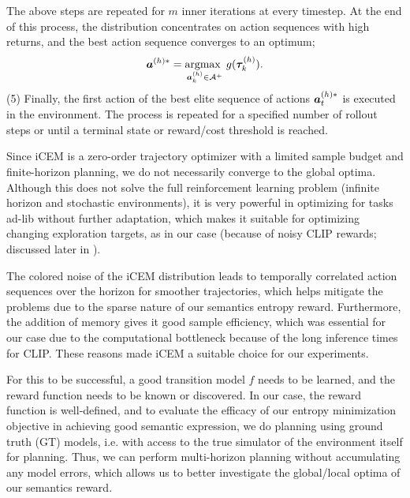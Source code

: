 The above steps are repeated for \(m\) inner iterations at every timestep.
At the end of this process, the distribution concentrates on action sequences with high returns, and the best action sequence converges to an optimum;
\begin{equation}
    \label{eq:planning-goal}
    \bm{a}^{(h)*} = \operatorname*{argmax~}_{\bm{a}^{(h)}_k \in \mathcal{A}^+} g(\bm{\tau}^{(h)}_k).
\end{equation}
(5) Finally, the first action of the best elite sequence of actions \(\bm{a}^{(h)*}_t\) is executed in the environment.
The process is repeated for a specified number of rollout steps or until a terminal state or reward/cost threshold is reached.

Since iCEM is a zero-order trajectory optimizer with a limited sample budget and finite-horizon planning, we do not necessarily converge to the global optima.
Although this does not solve the full reinforcement learning problem (infinite horizon and stochastic environments), it is very powerful in optimizing for tasks ad-lib without further adaptation, which makes it suitable for optimizing changing exploration targets, as in our case (because of noisy CLIP rewards; discussed later in ).

The colored noise of the iCEM distribution leads to temporally correlated action sequences over the horizon for smoother trajectories, which helps mitigate the problems due to the sparse nature of our semantics entropy reward.
Furthermore, the addition of memory gives it good sample efficiency, which was essential for our case due to the computational bottleneck because of the long inference times for CLIP.
These reasons made iCEM a suitable choice for our experiments.

For this to be successful, a good transition model \(f\) needs to be learned, and the reward function needs to be known or discovered.
In our case, the reward function is well-defined, and to evaluate the efficacy of our entropy minimization objective in achieving good semantic expression,
we do planning using ground truth (GT) models, i.e. with access to the true simulator of the environment itself for planning.
Thus, we can perform multi-horizon planning without accumulating any model errors, which allows us to better investigate the global/local optima of our semantics reward. 

